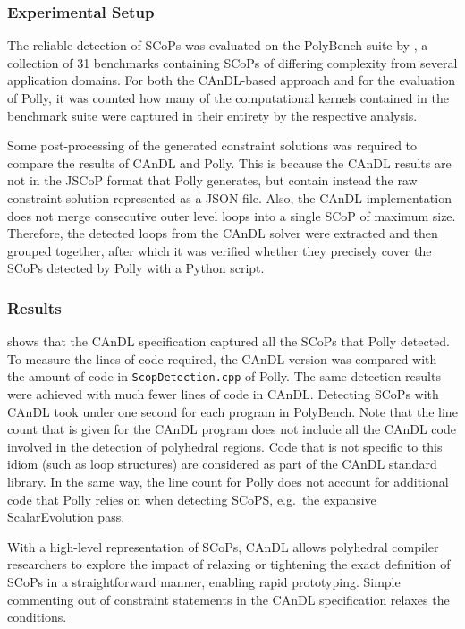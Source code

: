 \subsubsection{Experimental Setup}

    The reliable detection of SCoPs was evaluated on the PolyBench suite by
    \citet{polybench}, a collection of 31 benchmarks containing SCoPs of
    differing complexity from several application domains.
    For both the CAnDL-based approach and for the evaluation of Polly, it was
    counted how many of the computational kernels contained in the benchmark
    suite were captured in their entirety by the respective analysis.

    Some post-processing of the generated constraint solutions was required to
    compare the results of CAnDL and Polly.
    This is because the CAnDL results are not in the JSCoP format that Polly
    generates, but contain instead the raw constraint solution represented
    as a JSON file.
    Also, the CAnDL implementation does not merge consecutive outer level loops
    into a single SCoP of maximum size.
    Therefore, the detected loops from the CAnDL solver were extracted and then
    grouped together, after which it was verified whether they precisely cover
    the SCoPs detected by Polly with a Python script.

\subsubsection{Results}

     shows that the CAnDL specification captured all the
    SCoPs that Polly detected.
    To measure the lines of code required, the CAnDL version was compared with
    the amount of code in \texttt{ScopDetection.cpp} of Polly.
    The same detection results were achieved with much fewer lines of code in
    CAnDL.
    Detecting SCoPs with CAnDL took under one second for each program in
    PolyBench.
    Note that the line count that is given for the CAnDL program does not
    include all the CAnDL code involved in the detection of polyhedral regions.
    Code that is not specific to this idiom (such as loop structures) are
    considered as part of the CAnDL standard library.
    In the same way, the line count for Polly does not account for additional
    code that Polly relies on when detecting SCoPS, e.g.\ the expansive
    ScalarEvolution pass.

    With a high-level representation of SCoPs, CAnDL allows polyhedral
    compiler researchers to explore the impact of relaxing or tightening the
    exact definition of SCoPs in a straightforward manner, enabling rapid
    prototyping.
    Simple commenting out of constraint statements in the CAnDL specification
    relaxes the conditions.

